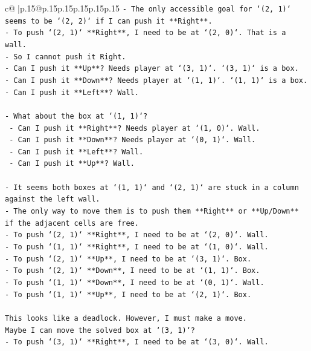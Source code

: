 \documentclass{article}
\begin{document}
{\begin{supertabular}{c@{$\;$}|p{.15\linewidth}@{}p{.15\linewidth}p{.15\linewidth}p{.15\linewidth}p{.15\linewidth}p{.15\linewidth}}
{{{\texttt{{-} The only accessible goal for `(2, 1)` seems to be `(2, 2)` if I can push it **Right**.} \\
\texttt{{-} To push `(2, 1)` **Right**, I need to be at `(2, 0)`. That is a wall.} \\
\texttt{{-} So I cannot push it Right.} \\
\texttt{{-} Can I push it **Up**? Needs player at `(3, 1)`. `(3, 1)` is a box.} \\
\texttt{{-} Can I push it **Down**? Needs player at `(1, 1)`. `(1, 1)` is a box.} \\
\texttt{{-} Can I push it **Left**? Wall.} \\
\\ 
\texttt{{-} What about the box at `(1, 1)`?} \\
\texttt{  {-} Can I push it **Right**? Needs player at `(1, 0)`. Wall.} \\
\texttt{  {-} Can I push it **Down**? Needs player at `(0, 1)`. Wall.} \\
\texttt{  {-} Can I push it **Left**? Wall.} \\
\texttt{  {-} Can I push it **Up**? Wall.} \\
\\ 
\texttt{{-} It seems both boxes at `(1, 1)` and `(2, 1)` are stuck in a column against the left wall.} \\
\texttt{{-} The only way to move them is to push them **Right** or **Up/Down** if the adjacent cells are free.} \\
\texttt{{-} To push `(2, 1)` **Right**, I need to be at `(2, 0)`. Wall.} \\
\texttt{{-} To push `(1, 1)` **Right**, I need to be at `(1, 0)`. Wall.} \\
\texttt{{-} To push `(2, 1)` **Up**, I need to be at `(3, 1)`. Box.} \\
\texttt{{-} To push `(2, 1)` **Down**, I need to be at `(1, 1)`. Box.} \\
\texttt{{-} To push `(1, 1)` **Down**, I need to be at `(0, 1)`. Wall.} \\
\texttt{{-} To push `(1, 1)` **Up**, I need to be at `(2, 1)`. Box.} \\
\\ 
\texttt{This looks like a deadlock. However, I must make a move.} \\
\texttt{Maybe I can move the solved box at `(3, 1)`?} \\
\texttt{{-} To push `(3, 1)` **Right**, I need to be at `(3, 0)`. Wall.} \\
}}}
\end{supertabular}}
\end{document}
